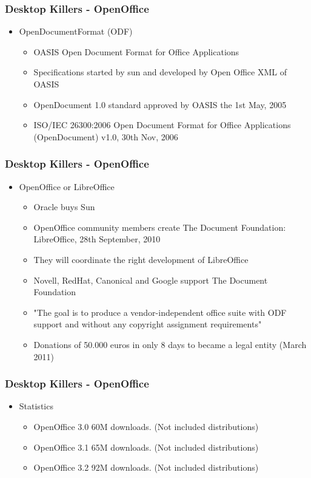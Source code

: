 \documentclass{beamer}
\begin{document}
\begin{frame}
\frametitle{Desktop Killers - OpenOffice}

\begin{itemize}
\item OpenDocumentFormat (ODF)
	\begin{itemize}
	\item OASIS Open Document Format for Office Applications
	\item Specifications started by sun and developed by Open Office XML of OASIS
	\item OpenDocument 1.0 standard approved  by OASIS the 1st May, 2005
	\item ISO/IEC 26300:2006 Open Document Format for Office Applications (OpenDocument) v1.0, 30th Nov, 2006
	\end{itemize}
\end{itemize}
\end{frame}

\begin{frame}
\frametitle{Desktop Killers - OpenOffice}

\begin{itemize}
\item OpenOffice or LibreOffice
\begin {itemize}
	\item Oracle buys Sun
	\item OpenOffice community members create The Document Foundation: LibreOffice, 28th September, 2010
	\item They will coordinate the right development of LibreOffice
	\item Novell, RedHat, Canonical and Google support The Document Foundation
	\item "The goal is to produce a vendor-independent office suite with ODF support and without any copyright assignment requirements"
	\item Donations of 50.000 euros in only 8 days to became a legal entity (March 2011)
\end {itemize}
\end{itemize}

\end{frame}

\begin{frame}
\frametitle{Desktop Killers - OpenOffice}


\begin{itemize}
\item Statistics
	\begin {itemize}
	\item OpenOffice 3.0 60M downloads. (Not included distributions)
	\item OpenOffice 3.1 65M downloads. (Not included distributions)
	\item OpenOffice 3.2 92M downloads. (Not included distributions)
	\end {itemize}
\end{itemize}

\end{frame}
\end{document}
